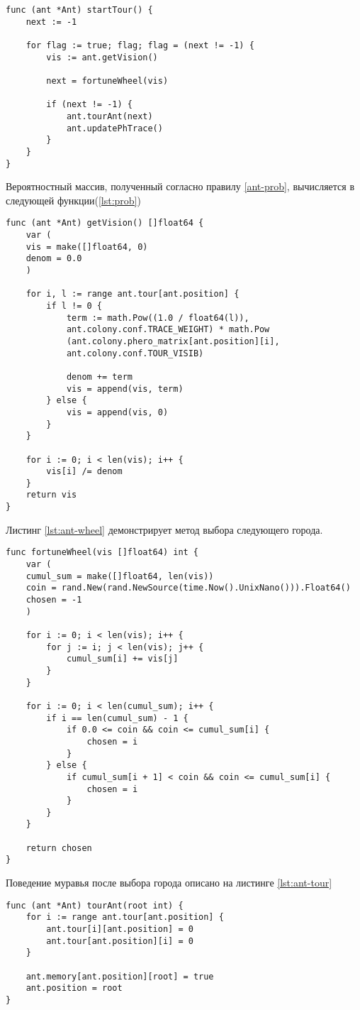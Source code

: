 \begin{lstlisting}[label=lst:ant-start,caption=Перемещение муравья по графу]
func (ant *Ant) startTour() {
	next := -1
	
	for flag := true; flag; flag = (next != -1) {
		vis := ant.getVision()
		
		next = fortuneWheel(vis)
		
		if (next != -1) {
			ant.tourAnt(next)
			ant.updatePhTrace()	
		}
	} 
}
\end{lstlisting}

Вероятностный массив, полученный согласно правилу \ref{ant-prob}, вычисляется в следующей функции(\ref{lst:prob})
\begin{lstlisting}[label=lst:prob,caption=Получение массива зрения для муравья]
func (ant *Ant) getVision() []float64 {
	var (
	vis = make([]float64, 0)
	denom = 0.0
	)
	
	for i, l := range ant.tour[ant.position] {
		if l != 0 {
			term := math.Pow((1.0 / float64(l)), 
			ant.colony.conf.TRACE_WEIGHT) * math.Pow
			(ant.colony.phero_matrix[ant.position][i], 
			ant.colony.conf.TOUR_VISIB)
			
			denom += term
			vis = append(vis, term)
		} else {
			vis = append(vis, 0)
		}
	}
	
	for i := 0; i < len(vis); i++ {
		vis[i] /= denom
	}
	return vis
}	
\end{lstlisting}
Листинг \ref{lst:ant-wheel} демонстрирует метод выбора следующего города.
\begin{lstlisting}[label=lst:ant-wheel,caption=Выбор следующего города]
func fortuneWheel(vis []float64) int {
	var (
	cumul_sum = make([]float64, len(vis))
	coin = rand.New(rand.NewSource(time.Now().UnixNano())).Float64()
	chosen = -1
	)
	
	for i := 0; i < len(vis); i++ {
		for j := i; j < len(vis); j++ {
			cumul_sum[i] += vis[j]
		}
	}

	for i := 0; i < len(cumul_sum); i++ {
		if i == len(cumul_sum) - 1 {
			if 0.0 <= coin && coin <= cumul_sum[i] {
				chosen = i
			}
		} else {
			if cumul_sum[i + 1] < coin && coin <= cumul_sum[i] {
				chosen = i
			}
		}
	}

	return chosen
}	
\end{lstlisting}
Поведение муравья после выбора города описано на листинге \ref{lst:ant-tour}
\begin{lstlisting}[label=lst:ant-tour,caption=Путь муравья в следующий город]
func (ant *Ant) tourAnt(root int) {
	for i := range ant.tour[ant.position] {
		ant.tour[i][ant.position] = 0
		ant.tour[ant.position][i] = 0
	}

	ant.memory[ant.position][root] = true	
	ant.position = root
}
\end{lstlisting}

